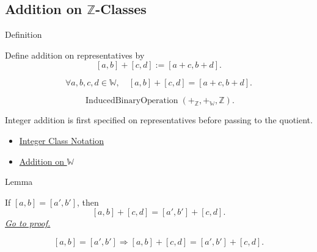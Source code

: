 \subsection*{\texorpdfstring{Addition on $\mathbb{Z}$-Classes}{Addition on Z-Classes}}

\begin{definitionbox}{Definition}
\begin{definition}
\label{def:addition-on-z-classes}
Define addition on representatives by
\[
[a,b]+[c,d]:=[a+c,b+d].
\]
\end{definition}
\end{definitionbox}

\begin{remark*}
\[
\forall a,b,c,d\in\mathbb{W},\quad
[a,b]+[c,d]=[a+c,b+d].
\]
\end{remark*}

\begin{remark*}
\[
\operatorname{InducedBinaryOperation}(+_{\mathbb{Z}},+_{\mathbb{W}},\mathbb{Z}).
\]
\end{remark*}

\begin{remark*}[Interpretation]
Integer addition is first specified on representatives before passing to the
quotient.
\end{remark*}

\begin{dependencies}
\begin{itemize}
  \item \hyperref[def:integer-class-notation]{Integer Class Notation}
  \item \hyperref[def:addition-on-w]{Addition on $\mathbb{W}$}
\end{itemize}
\end{dependencies}

\begin{lemmabox}{Lemma}
\begin{lemma}
\label{lem:addition-on-z-classes-respects-left-equivalence}
If $[a,b]=[a',b']$, then
\[
[a,b]+[c,d]=[a',b']+[c,d].
\]
\hyperref[prf:addition-on-z-classes-respects-left-equivalence]{\textit{Go to proof.}}
\end{lemma}
\end{lemmabox}

\begin{remark*}
\[
[a,b]=[a',b']
\Longrightarrow
[a,b]+[c,d]=[a',b']+[c,d].
\]
\end{remark*}

